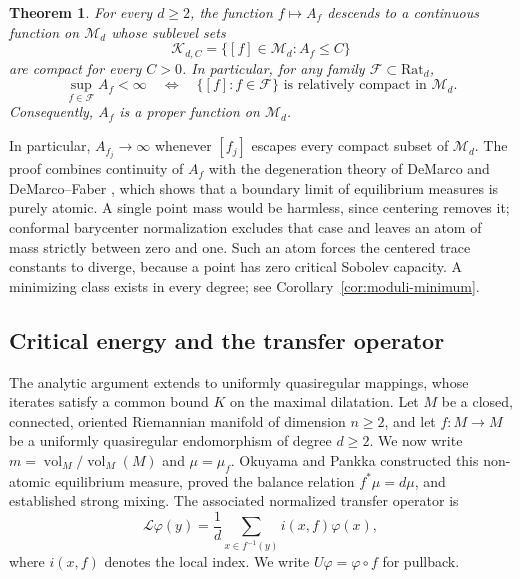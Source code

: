 \documentclass[10pt,a4paper]{amsart}
\newtheorem{theorem}{Theorem}[section]
\newcommand{\Lop}{\mathcal L}
\DeclareMathOperator{\vol}{vol}
\numberwithin{equation}{section}
\begin{document}
\begin{theorem}\label{thm:moduli-properness}
For every $d\ge2$, the function $f\mapsto A_f$ descends to a continuous function on $\mathcal M_d$ whose sublevel sets
\begin{equation}\label{eq:moduli-sublevel}
 \mathcal K_{d,C}=\{[f]\in\mathcal M_d:A_f\le C\}
\end{equation}
are compact for every $C>0$. In particular, for any family $\mathcal F\subset\mathrm{Rat}_d$,
\begin{equation}\label{eq:moduli-uniformity}
 \sup_{f\in\mathcal F}A_f<\infty
 \quad\Longleftrightarrow\quad
 \{[f]:f\in\mathcal F\}\text{ is relatively compact in }\mathcal M_d.
\end{equation}
Consequently, $A_f$ is a proper function on $\mathcal M_d$.
\end{theorem}

In particular, $A_{f_j}\to\infty$ whenever $[f_j]$ escapes every compact subset of $\mathcal M_d$. The proof combines continuity of $A_f$ with the degeneration theory of DeMarco \cite{DeM05} and DeMarco--Faber \cite{DF14}, which shows that a boundary limit of equilibrium measures is purely atomic. A single point mass would be harmless, since centering removes it; conformal barycenter normalization \cite{DE86} excludes that case and leaves an atom of mass strictly between zero and one. Such an atom forces the centered trace constants to diverge, because a point has zero critical Sobolev capacity. A minimizing class exists in every degree; see Corollary~\ref{cor:moduli-minimum}.

\subsection{Critical energy and the transfer operator}

The analytic argument extends to uniformly quasiregular mappings, whose iterates satisfy a common bound $K$ on the maximal dilatation. Let $M$ be a closed, connected, oriented Riemannian manifold of dimension $n\ge2$, and let $f\colon M\to M$ be a uniformly quasiregular endomorphism of degree $d\ge2$. We now write $m=\vol_M/\vol_M(M)$ and $\mu=\mu_f$. Okuyama and Pankka \cite{OP14} constructed this non-atomic equilibrium measure, proved the balance relation $f^*\mu=d\mu$, and established strong mixing. The associated normalized transfer operator is
\begin{equation}\label{eq:intro-transfer}
 \Lop\varphi(y)=\frac1d\sum_{x\in f^{-1}(y)}i(x,f)\varphi(x),
\end{equation}
where $i(x,f)$ denotes the local index. We write $U\varphi=\varphi\circ f$ for pullback.
\end{document}
